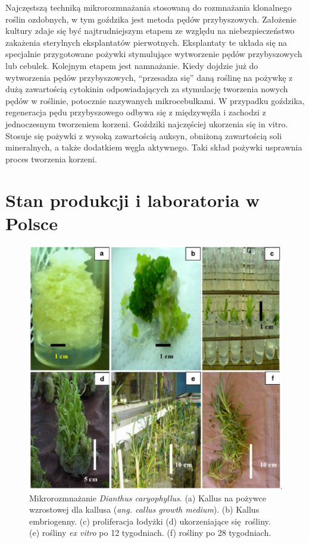 \documentclass[two column, twoside, a4paper]{article}
\begin{document}
Najczęstszą techniką mikrorozmnażania stosowaną do rozmnażania klonalnego roślin ozdobnych, w tym goździka jest metoda pędów przybyszowych. Założenie kultury zdaje się być najtrudniejszym etapem ze względu na niebezpieczeństwo zakażenia sterylnych eksplantatów pierwotnych. Eksplantaty te układa się na specjalnie przygotowane pożywki stymulujące wytworzenie pędów przybyszowych lub cebulek. Kolejnym etapem jest namnażanie. Kiedy dojdzie już do wytworzenia pędów przybyszowych, “przesadza się” daną roślinę na pożywkę z dużą zawartością cytokinin odpowiadających za stymulację tworzenia nowych pędów w roślinie, potocznie nazywanych mikrocebulkami. W przypadku goździka, regeneracja pędu przybyszowego odbywa się z międzywęźla i zachodzi z jednoczesnym tworzeniem korzeni.  Goździki najczęściej ukorzenia się in vitro. Stosuje się pożywki z wysoką zawartością auksyn, obniżoną zawartością soli mineralnych, a także dodatkiem węgla aktywnego. Taki skład pożywki usprawnia proces tworzenia korzeni.

\section{Stan produkcji i laboratoria w Polsce}

\begin{figure}[tp]
	\begin{tcolorbox}
		\centering
		\includegraphics[width=textwidth]{./figure1.png}
		\caption{Mikrorozmnażanie \textit{Dianthus caryophyllus}. (a) Kallus na pożywce wzrostowej dla kallusa (\textit{ang. callus growth medium}). (b) Kallus embriogenny. (c) proliferacja łodyżki (d) ukorzeniające się rośliny. (e) rośliny \textit{ex vitro} po 12 tygodniach. (f) rośliny po 28 tygodniach.}
	\end{tcolorbox}
\end{figure}
\end{document}

